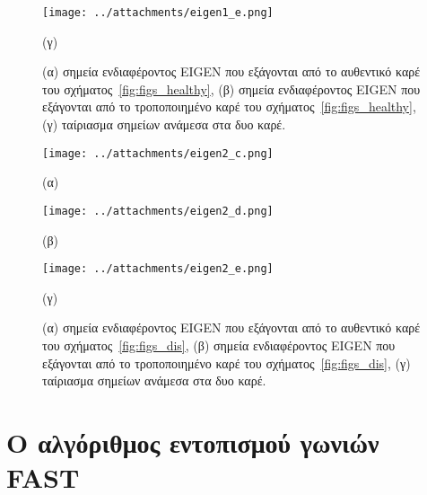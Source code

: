 \begin{figure}[!h]
\begin{minipage}[c]{1.0\linewidth}
 \centering
\texttt{[image: ../attachments/eigen1\_e.png]}
\caption*{(γ)}
\label{fig:eigen_3}
\end{minipage}
\caption{(α) σημεία ενδιαφέροντος EIGEN που εξάγονται από το αυθεντικό καρέ του σχήματος~\ref{fig:figs_healthy},
(β) σημεία ενδιαφέροντος EIGEN που εξάγονται από το τροποποιημένο καρέ του σχήματος~\ref{fig:figs_healthy},
(γ) ταίριασμα σημείων ανάμεσα στα δυο καρέ.}
\label{fig:eigen_healthy_figs}
\end{figure}

\newpage
 

 
 
\begin{figure}[ht!]
\begin{minipage}[b]{0.4\linewidth}
\centering
\texttt{[image: ../attachments/eigen2\_c.png]}
\caption*{(α)}
\label{fig:eigen_4}
\end{minipage}
\hspace{0.9cm}
\begin{minipage}[b]{0.7\linewidth}
\centering
\texttt{[image: ../attachments/eigen2\_d.png]}
\caption*{(β)}
\label{fig:eigen_5}
\end{minipage}
\end{figure} 

 
\begin{figure}[!h]
\begin{minipage}[b]{1.0\linewidth}
\centering
\texttt{[image: ../attachments/eigen2\_e.png]}
\caption*{(γ)}
\label{fig:eigen_6}
\end{minipage}
\caption{(α) σημεία ενδιαφέροντος EIGEN που εξάγονται από το αυθεντικό καρέ του σχήματος~\ref{fig:figs_dis},
(β) σημεία ενδιαφέροντος EIGEN που εξάγονται από το τροποποιημένο καρέ του σχήματος~\ref{fig:figs_dis},
(γ) ταίριασμα σημείων ανάμεσα στα δυο καρέ.}
\label{fig:eigen_dis_figs}
\end{figure} 
 
 

 \newpage  %
 
 \section{Ο αλγόριθμος εντοπισμού γωνιών FAST} 
 \label{sec:fast_ch}
 \vspace{1.5cm}
 
